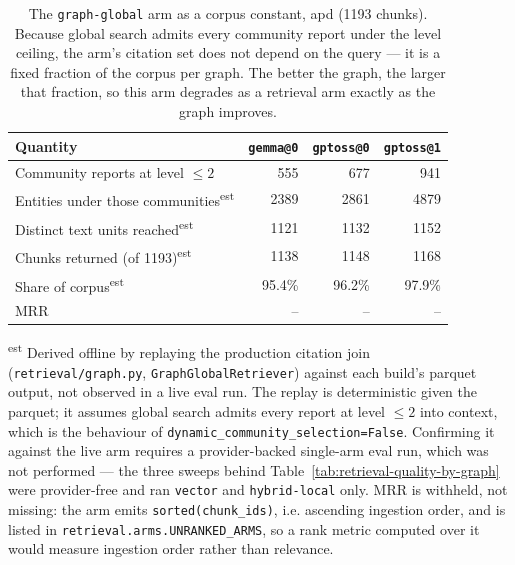 \begin{table}[htbp]
  \centering
  \caption{The \texttt{graph-global} arm as a corpus constant, apd (1193 chunks). Because global
    search admits every community report under the level ceiling, the arm's citation set does not
    depend on the query --- it is a fixed fraction of the corpus per graph. The better the graph,
    the larger that fraction, so this arm degrades as a retrieval arm exactly as the graph
    improves.}
  \label{tab:graph-global-constant}
  \begin{tabular}{lrrr}
    \toprule
    Quantity & \texttt{gemma@0} & \texttt{gptoss@0} & \texttt{gptoss@1} \\
    \midrule
    Community reports at level $\le 2$        &  555 &  677 &  941 \\
    Entities under those communities\textsuperscript{est} & 2389 & 2861 & 4879 \\
    Distinct text units reached\textsuperscript{est}      & 1121 & 1132 & 1152 \\
    \midrule
    Chunks returned (of 1193)\textsuperscript{est}        & 1138 & 1148 & 1168 \\
    Share of corpus\textsuperscript{est}                  & 95.4\% & 96.2\% & 97.9\% \\
    \midrule
    MRR & -- & -- & -- \\
    \bottomrule
  \end{tabular}

  \vspace{0.5em}
  \footnotesize
  \textsuperscript{est} Derived offline by replaying the production citation join
  (\texttt{retrieval/graph.py}, \texttt{GraphGlobalRetriever}) against each build's parquet output,
  not observed in a live eval run. The replay is deterministic given the parquet; it assumes global
  search admits every report at level $\le 2$ into context, which is the behaviour of
  \texttt{dynamic\_community\_selection=False}. Confirming it against the live arm requires a
  provider-backed single-arm eval run, which was not performed --- the three sweeps behind
  Table~\ref{tab:retrieval-quality-by-graph} were provider-free and ran
  \texttt{vector} and \texttt{hybrid-local} only.
  MRR is withheld, not missing: the arm emits \texttt{sorted(chunk\_ids)}, i.e. ascending
  ingestion order, and is listed in \texttt{retrieval.arms.UNRANKED\_ARMS}, so a rank metric computed
  over it would measure ingestion order rather than relevance.
\end{table}
